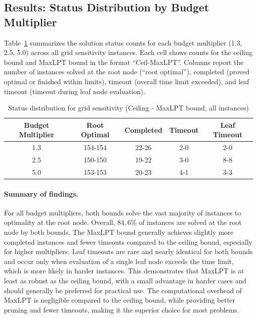 \subsection{Results: Status Distribution by Budget Multiplier}

Table~\ref{tab:grid-status-summary} summarizes the solution status counts for each budget multiplier (1.3, 2.5, 5.0) across all grid sensitivity instances. Each cell shows counts for the ceiling bound and MaxLPT bound in the format ``Ceil-MaxLPT''. Columns report the number of instances solved at the root node (``root optimal''), completed (proved optimal or finished within limits), timeout (overall time limit exceeded), and leaf timeout (timeout during leaf node evaluation).

\begin{table}[htbp]
\centering
\caption{Status distribution for grid sensitivity (Ceiling - MaxLPT bound, all instances)}
\label{tab:grid-status-summary}
\begin{tabular}{c|c|c|c|c}
\toprule
Budget Multiplier & Root Optimal & Completed & Timeout & Leaf Timeout \\
\midrule
1.3 & 154-154 & 22-26 & 2-0 & 2-0 \\
2.5 & 150-150 & 19-22 & 3-0 & 8-8 \\
5.0 & 153-153 & 20-23 & 4-1 & 3-3 \\
\bottomrule
\end{tabular}
\end{table}

\paragraph{Summary of findings.}
For all budget multipliers, 
both bounds solve the vast majority of instances to optimality at the root node. Overall, $84,6\%$ of instances are solved at the root node by both bounds.
The MaxLPT bound generally achieves slightly more completed instances and fewer timeouts compared to the ceiling bound, 
especially for higher multipliers. Leaf timeouts are rare and nearly identical for both bounds and occur only when evaluation of a single leaf node exceeds the time limit, which is more likely in harder instances.
This demonstrates that MaxLPT is at least as robust as the ceiling bound, with a small advantage in harder cases and should generally be preferred for practical use.
The computational overhead of MaxLPT is negligible compared to the ceiling bound, while providing better pruning and fewer timeouts, making it the superior choice for most problems.


